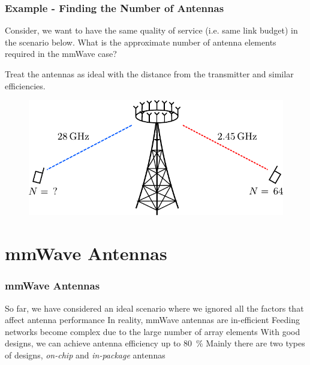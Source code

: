 \documentclass[10pt]{beamer}
\begin{document}
\begin{frame}
    \frametitle{Example - Finding the Number of Antennas}
    Consider, we want to have the same quality of service (i.e. same link budget) in the scenario below. What is the approximate number of antenna elements required in the mmWave case?

    Treat the antennas as ideal with the distance from the transmitter and similar efficiencies.

    \begin{figure}[h!]
        \centering
        \includegraphics[width=.75\textwidth]{example_antenna.pdf}
    \end{figure}
\end{frame}





\section{mmWave Antennas}

\begin{frame}
    \frametitle{mmWave Antennas}

    \begin{outline}
        \1 So far, we have considered an ideal scenario where we ignored all the factors that affect antenna performance
        \2 In reality, mmWave antennas are in-efficient
        \2 Feeding networks become complex due to the large number of array elements
        \1 With good designs, we can achieve antenna efficiency up to \SI{80}{\percent}
        \1 Mainly there are two types of designs, \textit{on-chip} and \textit{in-package} antennas
    \end{outline}
\end{frame}
\end{document}

